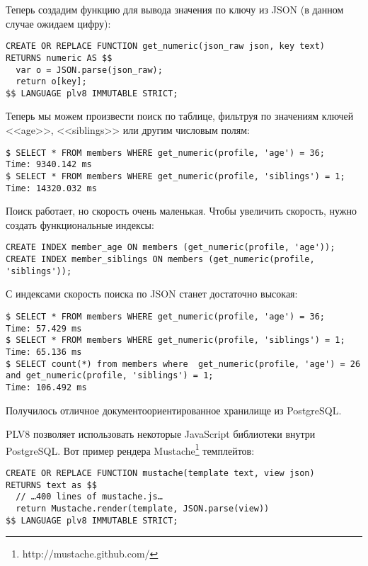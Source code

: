 Теперь создадим функцию для вывода значения по ключу из JSON (в данном случае ожидаем цифру):

\begin{lstlisting}[label=lst:plv8js11,caption=Функция для JSON]
CREATE OR REPLACE FUNCTION get_numeric(json_raw json, key text)
RETURNS numeric AS $$
  var o = JSON.parse(json_raw);
  return o[key];
$$ LANGUAGE plv8 IMMUTABLE STRICT;
\end{lstlisting}

Теперь мы можем произвести поиск по таблице, фильтруя по значениям ключей <<age>>, <<siblings>> или другим числовым полям:

\begin{lstlisting}[label=lst:plv8js12,caption=Поиск по данным JSON]
$ SELECT * FROM members WHERE get_numeric(profile, 'age') = 36;
Time: 9340.142 ms
$ SELECT * FROM members WHERE get_numeric(profile, 'siblings') = 1;
Time: 14320.032 ms
\end{lstlisting}

Поиск работает, но скорость очень маленькая. Чтобы увеличить скорость, нужно создать функциональные индексы:

\begin{lstlisting}[label=lst:plv8js13,caption=Создание индексов]
CREATE INDEX member_age ON members (get_numeric(profile, 'age'));
CREATE INDEX member_siblings ON members (get_numeric(profile, 'siblings'));
\end{lstlisting}

С индексами скорость поиска по JSON станет достаточно высокая:

\begin{lstlisting}[label=lst:plv8js14,caption=Поиск по данным JSON с индексами]
$ SELECT * FROM members WHERE get_numeric(profile, 'age') = 36;
Time: 57.429 ms
$ SELECT * FROM members WHERE get_numeric(profile, 'siblings') = 1;
Time: 65.136 ms
$ SELECT count(*) from members where  get_numeric(profile, 'age') = 26 and get_numeric(profile, 'siblings') = 1;
Time: 106.492 ms
\end{lstlisting}

Получилось отличное документоориентированное хранилище из PostgreSQL.

PLV8 позволяет использовать некоторые JavaScript библиотеки внутри PostgreSQL. Вот пример рендера Mustache\footnote{http://mustache.github.com/} темплейтов:

\begin{lstlisting}[label=lst:plv8js15,caption=Функция для рендера Mustache темплейтов]
CREATE OR REPLACE FUNCTION mustache(template text, view json)
RETURNS text as $$
  // …400 lines of mustache.js…
  return Mustache.render(template, JSON.parse(view))
$$ LANGUAGE plv8 IMMUTABLE STRICT;
\end{lstlisting}

